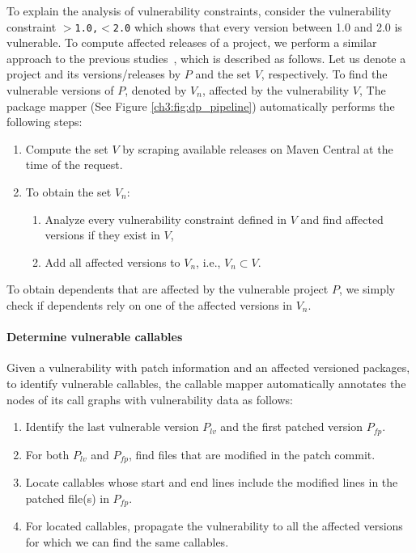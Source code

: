 To explain the analysis of vulnerability constraints, consider the vulnerability constraint \texttt{$>$1.0,$<$2.0} which shows that every version between 1.0 and 2.0 is vulnerable. To compute affected releases of a project, we perform a similar approach to the previous studies~\cite{decan2018impact}, which is described as follows.
Let us denote a project and its versions/releases by $P$ and the set $V$, respectively. To find the vulnerable versions of $P$, denoted by $V_{n}$, affected by the vulnerability $V$, The package mapper (See Figure \ref{ch3:fig:dp_pipeline}) automatically performs the following steps:
\begin{enumerate}
    \item Compute the set $V$ by scraping available releases on Maven Central at the time of the request.
    \item To obtain the set $V_{n}$:
    \begin{enumerate}[noitemsep]
        \item Analyze every vulnerability constraint defined in $V$ and find affected versions if they exist in $V$,
        \item Add all affected versions to $V_{n}$, i.e., $V_{n} \subset V$.
    \end{enumerate}
\end{enumerate}
 
 To obtain dependents that are affected by the vulnerable project $P$, we simply check if dependents rely on one of the affected versions in $V_{n}$.

 \paragraph{Determine vulnerable callables}
Given a vulnerability with patch information and an affected versioned packages, to identify vulnerable callables, the callable mapper automatically annotates the nodes of its call graphs with vulnerability data as follows:
\begin{enumerate}
\itemsep0em
\item Identify the last vulnerable version $P_{lv}$ and the first patched version $P_{fp}$.
\item For both $P_{lv}$ and $P_{fp}$, find files that are modified in the patch commit.
\item Locate callables whose start and end lines include the modified lines in the patched file(s) in $P_{fp}$.
\item For located callables, propagate the vulnerability to all the affected versions for which we can find the same callables. 
\end{enumerate}

